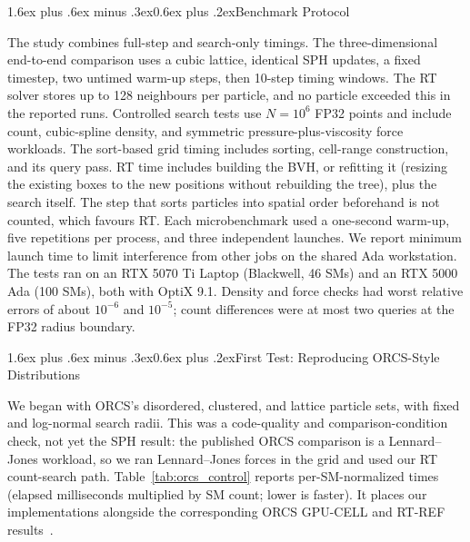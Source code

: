 \documentclass[conference]{IEEEtran}
\makeatletter
\renewcommand\subsection{\@startsection{subsection}{2}{\z@}%
  {1.6ex plus .6ex minus .3ex}{0.6ex plus .2ex}{\normalfont\normalsize\bfseries}}
\makeatother
\begin{document}
\subsection{Benchmark Protocol}

The study combines full-step and search-only timings. The three-dimensional end-to-end comparison uses a cubic lattice, identical SPH updates, a fixed timestep, two untimed warm-up steps, then 10-step timing windows. The RT solver stores up to 128 neighbours per particle, and no particle exceeded this in the reported runs. Controlled search tests use $N=10^6$ FP32 points and include count, cubic-spline density, and symmetric pressure-plus-viscosity force workloads. The sort-based grid timing includes sorting, cell-range construction, and its query pass. RT time includes building the BVH, or refitting it (resizing the existing boxes to the new positions without rebuilding the tree), plus the search itself. The step that sorts particles into spatial order beforehand is not counted, which favours RT. Each microbenchmark used a one-second warm-up, five repetitions per process, and three independent launches. We report minimum launch time to limit interference from other jobs on the shared Ada workstation. The tests ran on an RTX 5070 Ti Laptop (Blackwell, 46 SMs) and an RTX 5000 Ada (100 SMs), both with OptiX 9.1. Density and force checks had worst relative errors of about $10^{-6}$ and $10^{-5}$; count differences were at most two queries at the FP32 radius boundary.

\subsection{First Test: Reproducing ORCS-Style Distributions}

We began with ORCS's disordered, clustered, and lattice particle sets, with fixed and log-normal search radii. This was a code-quality and comparison-condition check, not yet the SPH result: the published ORCS comparison is a Lennard--Jones workload, so we ran Lennard--Jones forces in the grid and used our RT count-search path. Table~\ref{tab:orcs_control} reports per-SM-normalized times (elapsed milliseconds multiplied by SM count; lower is faster). It places our implementations alongside the corresponding ORCS GPU-CELL and RT-REF results~\cite{meneses2026rtnn}.
\end{document}
